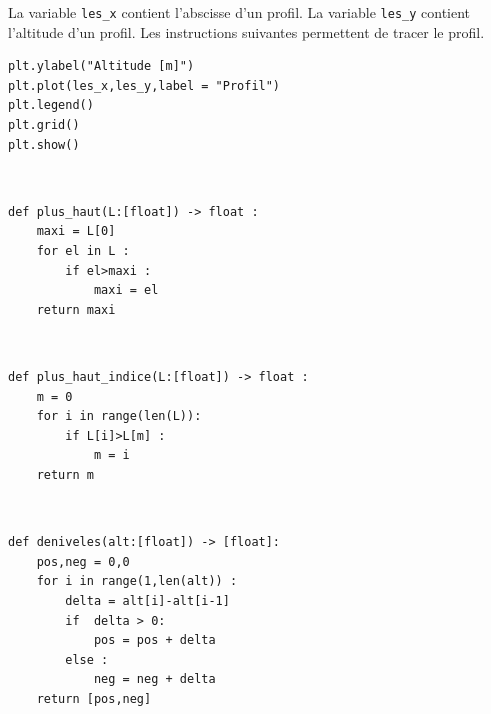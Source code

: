 La variable \lstinline{les_x} contient l'abscisse d'un profil.
La variable \lstinline{les_y} contient l'altitude d'un profil. Les instructions suivantes permettent de tracer le profil.

\begin{lstlisting}
plt.ylabel("Altitude [m]")
plt.plot(les_x,les_y,label = "Profil")
plt.legend()
plt.grid()
plt.show()
\end{lstlisting}




\ifprof
\begin{corrige}~\\
\vspace{-.5cm}
\begin{lstlisting}
def plus_haut(L:[float]) -> float :
    maxi = L[0]
    for el in L : 
        if el>maxi :
            maxi = el  
    return maxi
\end{lstlisting}
\end{corrige}
\else
\fi


\ifprof
\begin{corrige}~\\
\vspace{-.5cm}
\begin{lstlisting}
def plus_haut_indice(L:[float]) -> float :
    m = 0
    for i in range(len(L)):
        if L[i]>L[m] :
            m = i  
    return m
\end{lstlisting}
\end{corrige}
\else
\fi




\ifprof
\begin{corrige}~\\
\vspace{-.5cm}
\begin{lstlisting}
def deniveles(alt:[float]) -> [float]:
    pos,neg = 0,0
    for i in range(1,len(alt)) : 
        delta = alt[i]-alt[i-1]
        if  delta > 0: 
            pos = pos + delta
        else : 
            neg = neg + delta
    return [pos,neg]
\end{lstlisting}
\end{corrige}
\else
\fi

